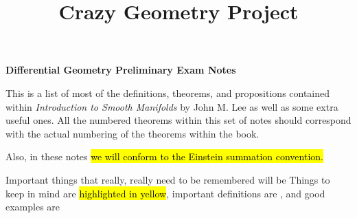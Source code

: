 
\usepackage{color}

\newcommand{\fkgl}{\mathfrak{gl}}
\newcommand{\op}{^{(p)}}
\newcommand{\dfng}{\vs\textbf{\hlg{Definition.}} }
\newcommand{\bgw}{\Lambda}


\title{Crazy Geometry Project}

\newcommand{\wowob}{with or without boundary}



\begin{center}
\textbf{\Large Differential Geometry Preliminary Exam Notes}
\end{center}

This is a list of most of the definitions, theorems, and propositions contained within \textit{Introduction to Smooth Manifolds} by John M. Lee as well as some extra useful ones. All the numbered theorems within this set of notes should correspond with the actual numbering of the theorems within the book. 

Also, in these notes \hl{we will conform to the Einstein summation convention.}

Important things that really, really need to be remembered will be  Things to keep in mind are \hl{highlighted in yellow}, important definitions are , and good examples are 

\tableofcontents
\newpage

















